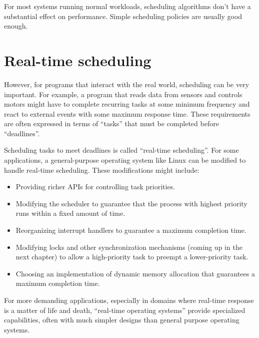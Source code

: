 \documentclass[12pt]{book}
\begin{document}
{\begin{itemize}
\end{itemize}

For most systems running normal workloads, scheduling algorithms
don't have a substantial effect on performance.  Simple scheduling
policies are usually good enough.


\section{Real-time scheduling}

However, for programs that interact with the real world, scheduling
can be very important.  For example, a program that reads data from
sensors and controls motors might have to complete recurring tasks at
some minimum frequency and react to external events with some maximum
response time.  These requirements are often expressed in terms of
``tasks'' that must be completed before ``deadlines''.

Scheduling tasks to meet deadlines is called ``real-time
  scheduling''.  For some applications, a general-purpose operating
system like Linux can be modified to handle real-time scheduling.
These modifications might include:

\begin{itemize}

\item Providing richer APIs for controlling task priorities.

\item Modifying the scheduler to guarantee that the process with
highest priority runs within a fixed amount of time.

\item Reorganizing interrupt handlers to guarantee
a maximum completion time.

\item Modifying locks and other synchronization mechanisms (coming up
  in the next chapter) to allow a high-priority task to preempt a
  lower-priority task.

\item Choosing an implementation of dynamic memory allocation that
guarantees a maximum completion time.

\end{itemize}

For more demanding applications, especially in domains where real-time
response is a matter of life and death, ``real-time operating
  systems'' provide specialized capabilities, often with much simpler
designs than general purpose operating systems.

}
\end{document}
